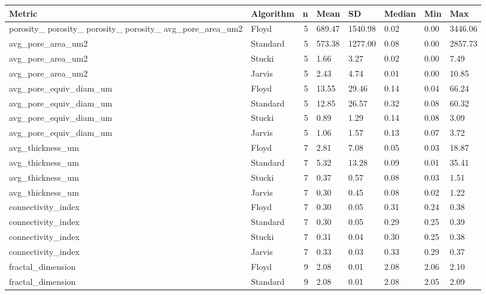 \begin{tabular}{llrlllll}
\toprule
Metric & Algorithm & n & Mean & SD & Median & Min & Max \\
\midrule
porosity_%
porosity_%
porosity_%
porosity_%
avg_pore_area_um2 & Floyd & 5 & 689.47 & 1540.98 & 0.02 & 0.00 & 3446.06 \\
avg_pore_area_um2 & Standard & 5 & 573.38 & 1277.00 & 0.08 & 0.00 & 2857.73 \\
avg_pore_area_um2 & Stucki & 5 & 1.66 & 3.27 & 0.02 & 0.00 & 7.49 \\
avg_pore_area_um2 & Jarvis & 5 & 2.43 & 4.74 & 0.01 & 0.00 & 10.85 \\
avg_pore_equiv_diam_um & Floyd & 5 & 13.55 & 29.46 & 0.14 & 0.04 & 66.24 \\
avg_pore_equiv_diam_um & Standard & 5 & 12.85 & 26.57 & 0.32 & 0.08 & 60.32 \\
avg_pore_equiv_diam_um & Stucki & 5 & 0.89 & 1.29 & 0.14 & 0.08 & 3.09 \\
avg_pore_equiv_diam_um & Jarvis & 5 & 1.06 & 1.57 & 0.13 & 0.07 & 3.72 \\
avg_thickness_um & Floyd & 7 & 2.81 & 7.08 & 0.05 & 0.03 & 18.87 \\
avg_thickness_um & Standard & 7 & 5.32 & 13.28 & 0.09 & 0.01 & 35.41 \\
avg_thickness_um & Stucki & 7 & 0.37 & 0.57 & 0.08 & 0.03 & 1.51 \\
avg_thickness_um & Jarvis & 7 & 0.30 & 0.45 & 0.08 & 0.02 & 1.22 \\
connectivity_index & Floyd & 7 & 0.30 & 0.05 & 0.31 & 0.24 & 0.38 \\
connectivity_index & Standard & 7 & 0.30 & 0.05 & 0.29 & 0.25 & 0.39 \\
connectivity_index & Stucki & 7 & 0.31 & 0.04 & 0.30 & 0.25 & 0.38 \\
connectivity_index & Jarvis & 7 & 0.33 & 0.03 & 0.33 & 0.29 & 0.37 \\
fractal_dimension & Floyd & 9 & 2.08 & 0.01 & 2.08 & 2.06 & 2.10 \\
fractal_dimension & Standard & 9 & 2.08 & 0.01 & 2.08 & 2.05 & 2.09 \\

\end{tabular}
